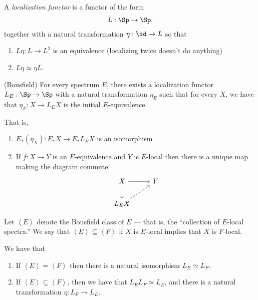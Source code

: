 A \textit{localization functor} is a functor of the form
\begin{align*}
    L : \Sp \to \Sp,
\end{align*}
together with a natural transformation $\eta : \id \to L$ so that
\begin{enumerate}
    \item $L\eta : L \to L^2$ is an equivalence (localizing twice doesn't do anything)
    \item $L \eta \simeq \eta L$.
\end{enumerate}

\begin{theorem} (Bousfield) For every spectrum $E$, there exists a localization functor $L_E: \Sp \to \Sp$ with a natural transformation $\eta_E$ such that for every $X$, we have that $\eta_E : X \to L_E X$ is the initial $E$-equivalence.
\end{theorem}

That is,
\begin{enumerate}
    \item $E_\ast (\eta_X) : E_\ast X \to E_\ast L_E X$ is an isomorphism
    \item If $f: X \to Y$ is an $E$-equivalence and $Y$ is $E$-local then there is a unique map making the diagram commute:
\[ \begin{tikzcd}
    X\rar\dar & Y\\
    L_E X \ar[ur,dashed] & 
\end{tikzcd} \]
\end{enumerate}

Let $\left\langle E \right\rangle$ denote the Bousfield class of $E$ --- that is, the ``collection of $E$-local spectra.'' We say that $\left\langle E \right\rangle \subseteq \left\langle F \right\rangle$ if $X$ is $E$-local implies that $X$ is $F$-local.

\begin{proposition} We have that
\begin{enumerate}
    \item If $\left\langle E \right\rangle = \left\langle F \right\rangle$ then there is a natural isomorphism $L_E \simeq L_F$.
    \item If $\left\langle E \right\rangle \subseteq \left\langle F \right\rangle$, then we have that $L_E L_F \simeq L_E$, and there is a natural transformation $\eta: L_F \to L_E$.
\end{enumerate}
\end{proposition}

